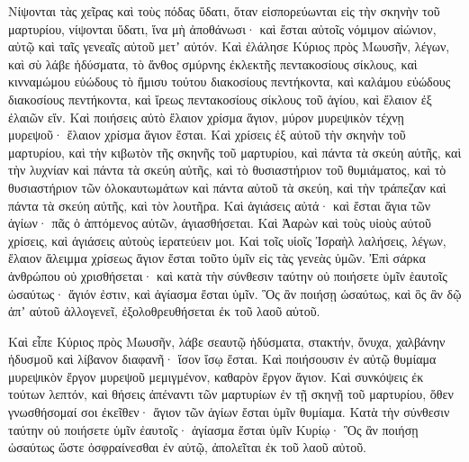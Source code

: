 {Νίψονται τὰς χεῖρας καὶ τοὺς πόδας ὕδατι, ὅταν εἰσπορεύωνται εἰς τὴν σκηνὴν τοῦ μαρτυρίου, νίψονται ὕδατι, ἵνα μὴ ἀποθάνωσι· καὶ ἔσται αὐτοῖς νόμιμον αἰώνιον, αὐτῷ καὶ ταῖς γενεαῖς αὐτοῦ μετʼ αὐτόν.
Καὶ ἐλάλησε Κύριος πρὸς Μωυσῆν, λέγων,
καὶ σὺ λάβε ἡδύσματα, τὸ ἄνθος σμύρνης ἐκλεκτῆς πεντακοσίους σίκλους, καὶ κινναμώμου εὐώδους τὸ ἥμισυ τούτου διακοσίους πεντήκοντα, καὶ καλάμου εὐώδους διακοσίους πεντήκοντα,
καὶ ἴρεως πεντακοσίους σίκλους τοῦ ἁγίου, καὶ ἔλαιον ἐξ ἐλαιῶν εἵν.
Καὶ ποιήσεις αὐτὸ ἔλαιον χρίσμα ἅγιον, μύρον μυρεψικὸν τέχνῃ μυρεψοῦ· ἔλαιον χρίσμα ἅγιον ἔσται.
Καὶ χρίσεις ἐξ αὐτοῦ τὴν σκηνὴν τοῦ μαρτυρίου, καὶ τὴν κιβωτὸν τῆς σκηνῆς τοῦ μαρτυρίου, καὶ πάντα τὰ σκεύη αὐτῆς,
καὶ τὴν λυχνίαν καὶ πάντα τὰ σκεύη αὐτῆς, καὶ τὸ θυσιαστήριον τοῦ θυμιάματος,
καὶ τὸ θυσιαστήριον τῶν ὁλοκαυτωμάτων καὶ πάντα αὐτοῦ τὰ σκεύη, καὶ τὴν τράπεζαν καὶ πάντα τὰ σκεύη αὐτῆς, καὶ τὸν λουτῆρα.
Καὶ ἁγιάσεις αὐτά· καὶ ἔσται ἅγια τῶν ἁγίων· πᾶς ὁ ἁπτόμενος αὐτῶν, ἁγιασθήσεται.
Καὶ Ἀαρὼν καὶ τοὺς υἱοὺς αὐτοῦ χρίσεις, καὶ ἁγιάσεις αὐτοὺς ἱερατεύειν μοι.
Καὶ τοῖς υἱοῖς Ἰσραὴλ λαλήσεις, λέγων, ἔλαιον ἄλειμμα χρίσεως ἅγιον ἔσται τοῦτο ὑμῖν εἰς τὰς γενεὰς ὑμῶν.
Ἐπὶ σάρκα ἀνθρώπου οὐ χρισθήσεται· καὶ κατὰ τὴν σύνθεσιν ταύτην οὐ ποιήσετε ὑμῖν ἑαυτοῖς ὡσαύτως· ἅγιόν ἐστιν, καὶ ἁγίασμα ἔσται ὑμῖν.
Ὃς ἂν ποιήσῃ ὡσαύτως, καὶ ὃς ἂν δῷ ἀπʼ αὐτοῦ ἀλλογενεῖ, ἐξολοθρευθήσεται ἐκ τοῦ λαοῦ αὐτοῦ.
\par }{\PP {}Καὶ εἶπε Κύριος πρὸς Μωυσῆν, λάβε σεαυτῷ ἡδύσματα, στακτήν, ὄνυχα, χαλβάνην ἡδυσμοῦ καὶ λίβανον διαφανῆ· ἴσον ἴσῳ ἔσται.
Καὶ ποιήσουσιν ἐν αὐτῷ θυμίαμα μυρεψικὸν ἔργον μυρεψοῦ μεμιγμένον, καθαρὸν ἔργον ἅγιον.
Καὶ συνκόψεις ἐκ τούτων λεπτόν, καὶ θήσεις ἀπέναντι τῶν μαρτυρίων ἐν τῇ σκηνῇ τοῦ μαρτυρίου, ὅθεν γνωσθήσομαί σοι ἐκεῖθεν· ἅγιον τῶν ἁγίων ἔσται ὑμῖν θυμίαμα.
Κατὰ τὴν σύνθεσιν ταύτην οὐ ποιήσετε ὑμῖν ἐαυτοῖς· ἁγίασμα ἔσται ὑμῖν Κυρίῳ·
Ὃς ἂν ποιήσῃ ὡσαύτως ὥστε ὀσφραίνεσθαι ἐν αὐτῷ, ἀπολεῖται ἐκ τοῦ λαοῦ αὐτοῦ.

}
